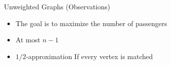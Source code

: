 \begin{frame}{Unweighted Graphs (Observations)}
\begin{itemize}
  \item<1> The goal is to maximize the number of passengers
  \item<2> At most $n - 1$
  \item<3> $1/2$-approximation If every vertex is matched 
\end{itemize}
\end{frame}